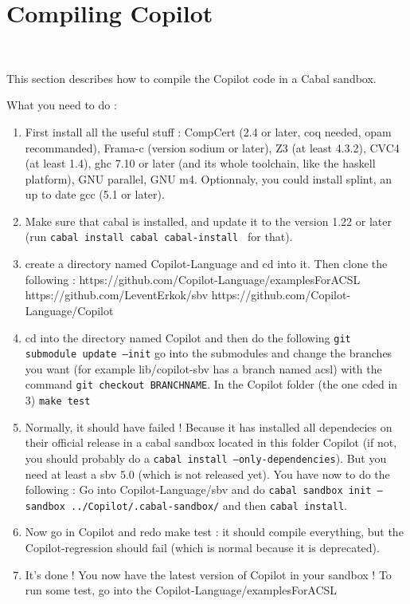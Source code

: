 \section{Compiling Copilot}~\label{sec:compile}

This section describes how to compile the Copilot code in a Cabal sandbox.

What you need to do : 
\begin{enumerate}
\item First install all the useful stuff : CompCert (2.4 or later, coq needed, opam recommanded), Frama-c (version sodium or later), Z3 (at least 4.3.2), CVC4 (at least 1.4), ghc 7.10 or later (and its whole toolchain, like the haskell platform), GNU parallel, GNU m4.
\subitem Optionnaly, you could install splint, an up to date gcc (5.1 or later).
\item Make sure that cabal is installed, and update it to the version 1.22 or later (run \texttt{cabal install cabal cabal-install } for that). 
\item create a directory named Copilot-Language and cd into it. Then clone the following :
\subitem https://github.com/Copilot-Language/examplesForACSL
\subitem https://github.com/LeventErkok/sbv
\subitem https://github.com/Copilot-Language/Copilot
\item cd into the directory named Copilot and then do the following
\subitem \texttt{git submodule update --init}
\subitem go into the submodules and change the branches you want (for example lib/copilot-sbv has a branch named acsl) with the command \texttt{git checkout BRANCHNAME}. 
\subitem In the Copilot folder (the one cded in 3) \texttt{make test}
\item Normally, it should have failed ! Because it has installed all dependecies on their official release in a cabal sandbox located in this folder Copilot (if not, you should probably do a \texttt{cabal install --only-dependencies}). But you need at least a sbv 5.0 (which is not released yet). You have now to do the following :
\subitem Go into Copilot-Language/sbv and do \texttt{cabal sandbox init --sandbox ../Copilot/.cabal-sandbox/} and then \texttt{cabal install}.
\item Now go in Copilot and redo make test : it should compile everything, but the Copilot-regression should fail (which is normal because it is deprecated).
\item It's done ! You now have the latest version of Copilot in your sandbox ! To run some test, go into the Copilot-Language/examplesForACSL

\end{enumerate}
